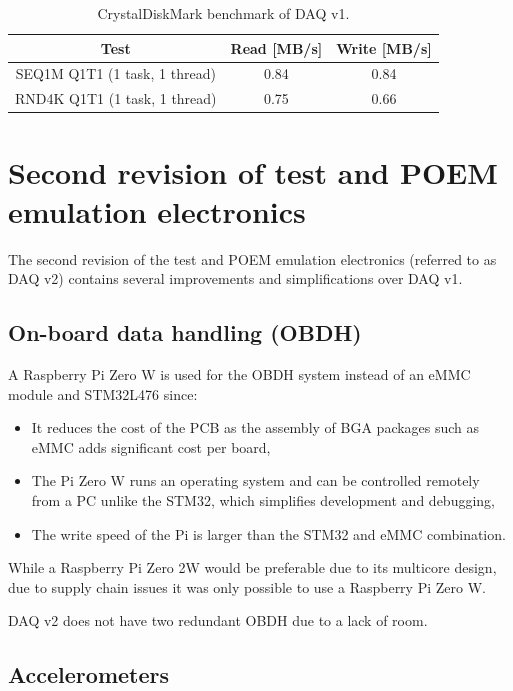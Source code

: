 \documentclass[a4paper,11pt]{article}
\begin{document}
\begin{table}[H]
\centering
\begin{tabular}{|c|c|c|}
  Test  & Read [MB/s] & Write [MB/s]\\
  \hline
  SEQ1M Q1T1 (1 task, 1 thread)     & 0.84  & 0.84\\
  RND4K Q1T1 (1 task, 1 thread)     & 0.75  & 0.66\\
\end{tabular}
\caption{CrystalDiskMark benchmark of DAQ v1.}
\label{tabl:daq-v1-diskmark}
\end{table}

\section{Second revision of test and POEM emulation electronics}
The second revision of the test and POEM emulation electronics (referred to as DAQ v2) contains several improvements and simplifications over DAQ v1.

\subsection{On-board data handling (OBDH)}
A Raspberry Pi Zero W is used for the OBDH system instead of an eMMC module and STM32L476 since:
\begin{itemize}
  \item It reduces the cost of the PCB as the assembly of BGA packages such as eMMC adds significant cost per board,
  \item The Pi Zero W runs an operating system and can be controlled remotely from a PC unlike the STM32, which simplifies development and debugging,
  \item The write speed of the Pi is larger than the STM32 and eMMC combination. %
\end{itemize}

While a Raspberry Pi Zero 2W would be preferable due to its multicore design, due to supply chain issues it was only possible to use a Raspberry Pi Zero W.

DAQ v2 does not have two redundant OBDH due to a lack of room.

\subsection{Accelerometers}
\end{document}

